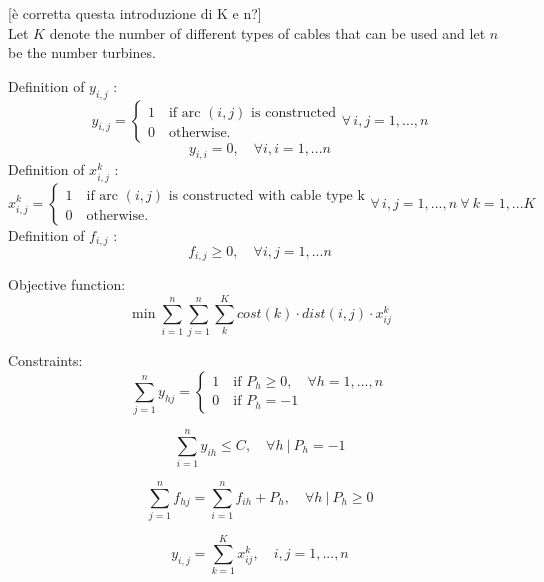 [è corretta questa introduzione di K e n?]\\

Let $K$ denote the number of different types of cables that can be used and let $n$ be the number turbines. 

Definition of $y_{i,j}$ :
\[
	y_{i,j} =
   \begin{cases}
   1 \quad \mbox{if arc } (i,j) \mbox{ is constructed} \\
   0 \quad \mbox{otherwise.} 
   \end{cases}
   \forall \,i,j = 1, ..., n 
\]
\[
	y_{i,i} = 0, \quad \forall i,i= 1, ... n 
\]
Definition of $x^k_{i,j}$ :
\[
	x^k_{i,j} =
   \begin{cases}
   1 \quad \mbox{if arc } (i,j) \mbox{ is constructed with cable type k} \\
   0 \quad \mbox{otherwise.} 
   \end{cases}
   \forall \,i,j = 1, ..., n \ \forall \ k = 1,... K
\]
Definition of $f_{i,j}$ :
\[
	f_{i,j} \geq 0, \quad \forall i,j= 1, ... n
\]

Objective function: 
\begin{equation}\label{eq:obj}
	\min{\sum^n_{i=1} \sum^n_{j=1} \sum^K_{k} cost(k) \cdot dist(i,j) \cdot x^k_{ij}}
\end{equation}

Constraints: 
\begin{equation}\label{eq:numberCable}
	\sum^n_{j = 1} y_{hj} = 
	\begin{cases}
   1 \quad \mbox{if } P_h \geq 0, \quad \forall h=1,...,n \\
   0 \quad \mbox{if } P_h = -1
   \end{cases}
\end{equation}

\begin{equation}\label{eq:basestation}
	\sum^n_{i =1} y_{ih} \leq C, \quad \forall h \ | \ P_h = -1
\end{equation}

\begin{equation}\label{eq:flux}
	\sum^n_{j=1} f_{hj} = \sum^n_{i=1} f_{ih}+ P_h, \quad \forall h \ | \ P_h \geq 0
\end{equation}

\begin{equation}\label{eq:oneCable}
	y_{i,j} = \sum^K_{k=1} x^k_{ij}, \quad i,j = 1,...,n
\end{equation}

